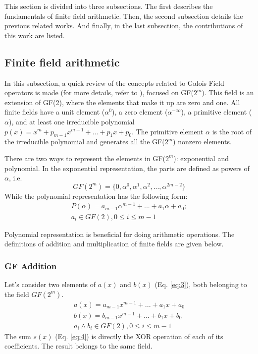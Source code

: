 This section is divided into three subsections. The first describes the fundamentals of finite field arithmetic. 
Then, the second subsection details the previous related works. And finally, in the last subsection, 
the contributions of this work are listed.

\subsection{Finite field arithmetic}

In this subsection, a quick review of the concepts related to Galois Field operators is made (for more details, refer to \cite{deschamps2009hardware}), 
focused on GF($2^m$). This field is an extension of GF(2), where the elements that make it up are zero and one. 
All finite fields have a unit element ($\alpha^0$), a zero element ($\alpha^{-\infty}$), a primitive element ($\alpha$), and at least one irreducible polynomial 
$p(x) = x^m + p_{m-1}x^{m-1} + ... + p_{1}x + p_{0}$. The primitive element $\alpha$ is the root of the irreducible polynomial and 
generates all the GF($2^m$) nonzero elements.


There are two ways to represent the elements in GF($2^m$): exponential and polynomial. 
In the exponential representation, the parts are defined as powers of $\alpha$, i.e.
\begin{equation}
 GF (2^m) = \{ 0, \alpha^0, \alpha^1, \alpha^2, ..., \alpha^{2m-2}  \}
 \label{eq:1}
\end{equation}
While the polynomial representation has the following form:
\begin{equation}
\begin{split}
 P(\alpha) = a_{m-1}\alpha^{m-1} + ... + a_{1}\alpha + a_{0};\\ 
 a_{i} \in GF(2), 0 \leq i \leq m-1
 \end{split}
 \label{eq:2}
\end{equation}


Polynomial representation is beneficial for doing arithmetic operations. %
The definitions of addition and multiplication of finite fields are given below.


\subsubsection{GF Addition}
Let's consider two elements of $a(x)$ and $b(x)$ (Eq. \ref{eq:3}), both belonging to the field $GF(2^m)$.
\begin{equation}
\begin{split}
 a(x) = a_{m-1}x^{m-1} + ... + a_{1}x + a_{0}\\
 b(x) = b_{m-1}x^{m-1} + ... + b_{1}x + b_{0}\\
 a_{i} \wedge b_{i} \in GF(2), 0 \leq i \leq m-1
 \end{split}
 \label{eq:3}
\end{equation}
The sum $s(x)$ (Eq. \ref{eq:4}) is directly the XOR operation of each of its coefficients. The result belongs to the same field.

